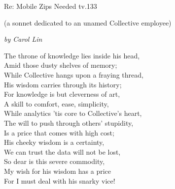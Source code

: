\documentclass[10pt,letterpaper]{article}
\begin{document}
\begin{centering}

{\Huge Re: Mobile Zips Needed tv.133}  \vspace{.5cm} 

{\large (a sonnet dedicated to an unamed Collective employee)} \vspace{.5cm}

\emph{\large by Carol Lin} \vspace{1cm}

{
\Large
\noindent The throne of knowledge lies inside his head, \\
Amid those dusty shelves of memory; \\
While Collective hangs upon a fraying thread, \\
His wisdom carries through its history; \\
For knowledge is but cleverness of art, \\
A skill to comfort, ease, simplicity, \\
While analytics 'tis core to Collective's heart, \\
The will to push through others' stupidity, \\
Is a price that comes with high cost; \\
His cheeky wisdom is a certainty, \\ 
We can trust the data will not be lost, \\
So dear is this severe commodity, \\
My wish for his wisdom has a price \\
For I must deal with his snarky vice! \\
}

\end{centering}
\end{document}
